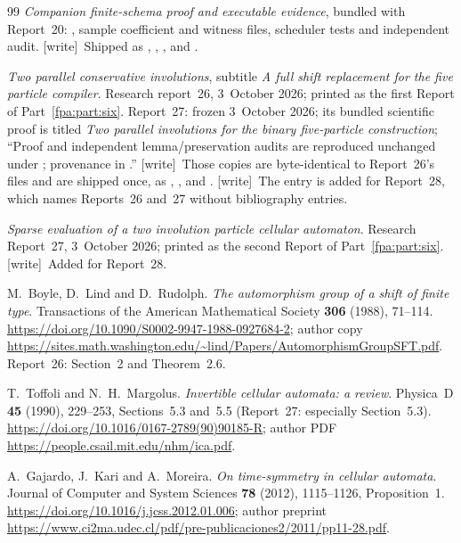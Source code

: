 \documentclass[11pt,a4paper]{article}
\numberwithin{equation}{section}
\newcommand{\wtag}{\textup{[write]}}
\begin{document}
\begin{thebibliography}{99}
\emph{Companion finite-schema proof and executable evidence}, bundled with Report~20: , sample coefficient and witness files, scheduler tests and independent audit. \wtag\ Shipped as , , ,  and .

\emph{Two parallel conservative involutions}, subtitle \emph{A full shift replacement for the five particle compiler}. Research report~26, 3~October 2026; printed as the first Report of Part~\ref{fpa:part:six}. Report~27: frozen 3~October 2026; its bundled scientific proof is titled \emph{Two parallel involutions for the binary five-particle construction}; ``Proof and independent lemma/preservation audits are reproduced unchanged under ; provenance in .'' \wtag\ Those copies are byte-identical to Report~26's files and are shipped once, as , ,  and . \wtag\ The entry is added for Report~28, which names Reports~26 and~27 without bibliography entries.

\emph{Sparse evaluation of a two involution particle cellular automaton}. Research Report~27, 3~October 2026; printed as the second Report of Part~\ref{fpa:part:six}. \wtag\ Added for Report~28.

M.~Boyle, D.~Lind and D.~Rudolph. \emph{The automorphism group of a shift of finite type}. Transactions of the American Mathematical Society \textbf{306} (1988), 71--114. \url{https://doi.org/10.1090/S0002-9947-1988-0927684-2}; author copy \url{https://sites.math.washington.edu/~lind/Papers/AutomorphismGroupSFT.pdf}. Report~26: Section~2 and Theorem~2.6.

T.~Toffoli and N.~H.~Margolus. \emph{Invertible cellular automata: a review}. Physica~D \textbf{45} (1990), 229--253, Sections~5.3 and~5.5 (Report~27: especially Section~5.3). \url{https://doi.org/10.1016/0167-2789(90)90185-R}; author PDF \url{https://people.csail.mit.edu/nhm/ica.pdf}.

A.~Gajardo, J.~Kari and A.~Moreira. \emph{On time-symmetry in cellular automata}. Journal of Computer and System Sciences \textbf{78} (2012), 1115--1126, Proposition~1. \url{https://doi.org/10.1016/j.jcss.2012.01.006}; author preprint \url{https://www.ci2ma.udec.cl/pdf/pre-publicaciones2/2011/pp11-28.pdf}.


\end{thebibliography}
\end{document}
